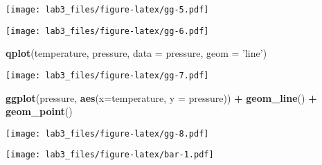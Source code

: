\documentclass[
]{article}
\newenvironment{Shaded}{\begin{snugshade}}{\end{snugshade}}
\newcommand{\CommentTok}[1]{\textcolor[rgb]{0.56,0.35,0.01}{\textit{#1}}}
\newcommand{\DataTypeTok}[1]{\textcolor[rgb]{0.13,0.29,0.53}{#1}}
\newcommand{\KeywordTok}[1]{\textcolor[rgb]{0.13,0.29,0.53}{\textbf{#1}}}
\newcommand{\NormalTok}[1]{#1}
\newcommand{\OperatorTok}[1]{\textcolor[rgb]{0.81,0.36,0.00}{\textbf{#1}}}
\newcommand{\StringTok}[1]{\textcolor[rgb]{0.31,0.60,0.02}{#1}}
\begin{document}
\texttt{[image: lab3\_files/figure-latex/gg-5.pdf]}

\begin{Shaded}
\end{Shaded}

\texttt{[image: lab3\_files/figure-latex/gg-6.pdf]}

\begin{Shaded}
\begin{Highlighting}[]
\KeywordTok{qplot}\NormalTok{(temperature, pressure, }\DataTypeTok{data =}\NormalTok{ pressure, }\DataTypeTok{geom =} \StringTok{'line'}\NormalTok{)}
\end{Highlighting}
\end{Shaded}

\texttt{[image: lab3\_files/figure-latex/gg-7.pdf]}

\begin{Shaded}
\begin{Highlighting}[]
\KeywordTok{ggplot}\NormalTok{(pressure, }\KeywordTok{aes}\NormalTok{(}\DataTypeTok{x=}\NormalTok{temperature, }\DataTypeTok{y =}\NormalTok{ pressure)) }\OperatorTok{+}\StringTok{ }\KeywordTok{geom_line}\NormalTok{() }\OperatorTok{+}\StringTok{ }\KeywordTok{geom_point}\NormalTok{()}
\end{Highlighting}
\end{Shaded}

\texttt{[image: lab3\_files/figure-latex/gg-8.pdf]}

\begin{Shaded}
\end{Shaded}

\texttt{[image: lab3\_files/figure-latex/bar-1.pdf]}

\begin{Shaded}
\end{Shaded}
\end{document}
